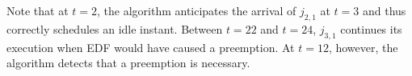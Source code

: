 \documentclass[a4paper,10pt]{article}
\begin{document}
        Note that at $t=2$, the algorithm anticipates the arrival of $j_{2,1}$ at $t=3$ and thus correctly schedules an idle instant. Between $t=22$ and $t=24$, $j_{3,1}$ continues its execution when EDF would have caused a preemption. At $t=12$, however, the algorithm detects that a preemption is necessary.

\nocite{*}


\end{document}
